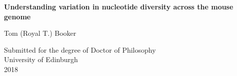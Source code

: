 \thispagestyle{empty}

\begin{minipage}{\textwidth}
\end{minipage}
\begin{center}
\vspace{2cm}
{ \Huge \textbf{Understanding variation in nucleotide diversity across the mouse genome}
  \par
  \vspace{2.5cm} 
{\Large Tom (Royal T.) Booker \par}
}
\end{center}
\vfill
\begin{center}
\vspace{0.5cm}
{\Large Submitted for the degree of Doctor of Philosophy\\
University of Edinburgh\\
2018}
\end{center}

\newpage
\thispagestyle{empty}


